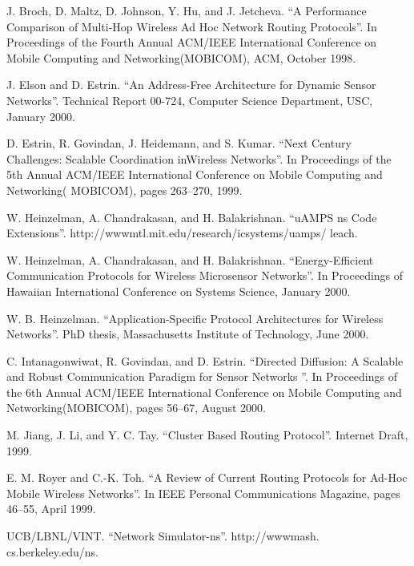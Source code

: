\documentclass[journal]{IEEEtran}
\begin{document}
\begin{CJK}{UTF8}{gbsn}

%
%
%

\begin{thebibliography}{1}

J. Broch, D. Maltz, D. Johnson, Y. Hu, and J. Jetcheva.
“A Performance Comparison of Multi-Hop Wireless Ad
Hoc Network Routing Protocols”. In Proceedings of the
Fourth Annual ACM/IEEE International Conference on Mobile
Computing and Networking(MOBICOM), ACM, October 1998.

J. Elson and D. Estrin. “An Address-Free Architecture
for Dynamic Sensor Networks”. Technical Report 00-724,
Computer Science Department, USC, January 2000.

D. Estrin, R. Govindan, J. Heidemann, and S. Kumar. “Next
Century Challenges: Scalable Coordination inWireless Networks”.
In Proceedings of the 5th Annual ACM/IEEE International
Conference on Mobile Computing and Networking(
MOBICOM), pages 263–270, 1999.

W. Heinzelman, A. Chandrakasan, and H. Balakrishnan.
“uAMPS ns Code Extensions”. http://wwwmtl.mit.edu/research/icsystems/uamps/ leach.

W. Heinzelman, A. Chandrakasan, and H. Balakrishnan. “Energy-Efficient Communication Protocols for Wireless
Microsensor Networks”. In Proceedings of Hawaiian International
Conference on Systems Science, January 2000.

W. B. Heinzelman. “Application-Specific Protocol Architectures
for Wireless Networks”. PhD thesis, Massachusetts
Institute of Technology, June 2000.

C. Intanagonwiwat, R. Govindan, and D. Estrin. “Directed
Diffusion: A Scalable and Robust Communication
Paradigm for Sensor Networks ”. In Proceedings of the
6th Annual ACM/IEEE International Conference on Mobile
Computing and Networking(MOBICOM), pages 56–67, August
2000.

M. Jiang, J. Li, and Y. C. Tay. “Cluster Based Routing Protocol”.
Internet Draft, 1999.

E. M. Royer and C.-K. Toh. “A Review of Current Routing
Protocols for Ad-Hoc Mobile Wireless Networks”. In
IEEE Personal Communications Magazine, pages 46–55,
April 1999.

UCB/LBNL/VINT. “Network Simulator-ns”. http://wwwmash.
cs.berkeley.edu/ns.
\end{thebibliography}


\end{CJK}
\end{document}

